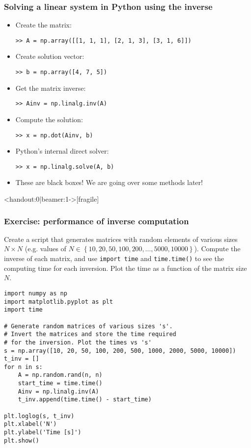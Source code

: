 \begin{frame}[fragile]
  \frametitle{Solving a linear system in Python using the inverse}
  \begin{itemize}
    \item Create the matrix:
    \begin{lstlisting}
>> A = np.array([[1, 1, 1], [2, 1, 3], [3, 1, 6]])    
    \end{lstlisting}\pause
    \item Create solution vector:
    \begin{lstlisting}
>> b = np.array([4, 7, 5]) 
    \end{lstlisting}\pause
    \item Get the matrix inverse:
    \begin{lstlisting}
>> Ainv = np.linalg.inv(A) 
    \end{lstlisting}\pause
    \item Compute the solution:
    \begin{lstlisting}
>> x = np.dot(Ainv, b)   
    \end{lstlisting}\pause
    \item Python's internal direct solver:
    \begin{lstlisting}
>> x = np.linalg.solve(A, b)
    \end{lstlisting}
    \item {}These are black boxes! We are going over some methods later!
  \end{itemize}
\end{frame}

\begin{frame}<handout:0|beamer:1->[fragile]
  \frametitle{Exercise: performance of inverse computation}
  Create a script that generates matrices with random elements of various sizes $N\times N$ (e.g. values of $N\in\left\{10,20,50,100,200,\ldots,5000,10000\right\}$). Compute the inverse of each matrix, and use \lstinline$import time$ and \lstinline$time.time()$ to see the computing time for each inversion. Plot the time as a function of the matrix size $N$. \pause
    \begin{lstlisting}
import numpy as np
import matplotlib.pyplot as plt
import time

# Generate random matrices of various sizes 's'. 
# Invert the matrices and store the time required 
# for the inversion. Plot the times vs 's'
s = np.array([10, 20, 50, 100, 200, 500, 1000, 2000, 5000, 10000])
t_inv = []
for n in s:
    A = np.random.rand(n, n)
    start_time = time.time()
    Ainv = np.linalg.inv(A)
    t_inv.append(time.time() - start_time)

plt.loglog(s, t_inv)
plt.xlabel('N')
plt.ylabel('Time [s]')
plt.show()
    \end{lstlisting}
\end{frame}


